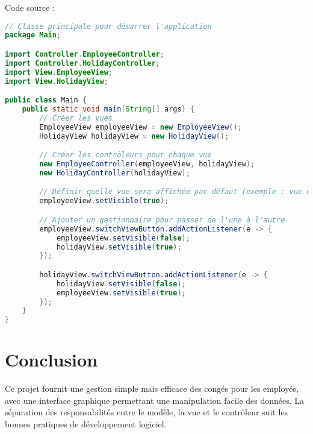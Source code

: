 \documentclass[a4paper,12pt]{article}
\begin{document}
Code source :
\begin{lstlisting}[language=Java]
// Classe principale pour démarrer l'application
package Main;

import Controller.EmployeeController;
import Controller.HolidayController;
import View.EmployeeView;
import View.HolidayView;

public class Main {
    public static void main(String[] args) {
        // Créer les vues
        EmployeeView employeeView = new EmployeeView();
        HolidayView holidayView = new HolidayView();

        // Créer les contrôleurs pour chaque vue
        new EmployeeController(employeeView, holidayView);
        new HolidayController(holidayView);

        // Définir quelle vue sera affichée par défaut (exemple : vue des employés)
        employeeView.setVisible(true);

        // Ajouter un gestionnaire pour passer de l'une à l'autre
        employeeView.switchViewButton.addActionListener(e -> {
            employeeView.setVisible(false);
            holidayView.setVisible(true);
        });

        holidayView.switchViewButton.addActionListener(e -> {
            holidayView.setVisible(false);
            employeeView.setVisible(true);
        });
    }
}
\end{lstlisting}

\section{Conclusion}
Ce projet fournit une gestion simple mais efficace des congés pour les employés, avec une interface graphique permettant une manipulation facile des données. La séparation des responsabilités entre le modèle, la vue et le contrôleur suit les bonnes pratiques de développement logiciel.
\end{document}

